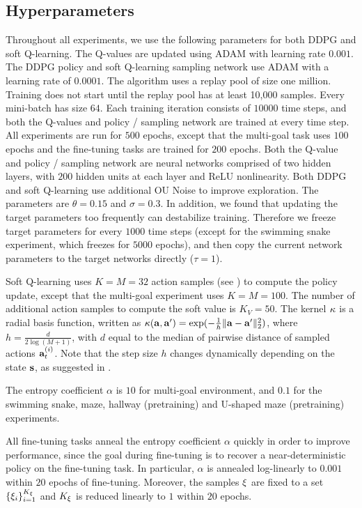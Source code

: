 \subsection{Hyperparameters}
\label{app: hyperparameters}
Throughout all experiments, we use the following parameters for both DDPG and soft Q-learning. The Q-values are updated using ADAM with learning rate $0.001$. The DDPG policy and soft Q-learning sampling network use ADAM with a learning rate of $0.0001$. The algorithm uses a replay pool of size one million. Training does not start until the replay pool has at least 10,000 samples. Every mini-batch has size $64$. Each training iteration consists of $10000$ time steps, and both the Q-values and policy / sampling network are trained at every time step. All experiments are run for $500$ epochs, except that the multi-goal task uses $100$ epochs and the fine-tuning tasks are trained for $200$ epochs. Both the Q-value and policy / sampling network are neural networks comprised of two hidden layers, with $200$ hidden units at each layer and ReLU nonlinearity. Both DDPG and soft Q-learning use additional OU Noise \cite{uhlenbeck1930theory, lillicrap2015continuous} to improve exploration. The parameters are $\theta = 0.15$ and $\sigma = 0.3$. In addition, we found that updating the target parameters too frequently can destabilize training. Therefore we freeze target parameters for every $1000$ time steps (except for the swimming snake experiment, which freezes for $5000$ epochs), and then copy the current network parameters to the target networks directly ($\tau = 1$).

Soft Q-learning uses $K=M=32$ action samples (see ) to compute the policy update, except that the multi-goal experiment uses $K=M=100$. The number of additional action samples to compute the soft value is $K_V = 50$. The kernel $\kappa$ is a radial basis function, written as $\kappa(\mathbf{a},\mathbf{a}') = \exp(-\frac{1}{h}\|\mathbf{a}-\mathbf{a}'\|_2^2)$, where $h = \frac{d}{2\log(M+1)}$, with $d$ equal to the median of pairwise distance of sampled actions ${\mathbf{a}_t^{(i)}}$. Note that the step size $h$ changes dynamically depending on the state $\mathbf{s}$, as suggested in \cite{liu2016stein}. 

The entropy coefficient $\alpha$ is $10$ for multi-goal environment, and $0.1$ for the swimming snake, maze, hallway (pretraining) and U-shaped maze (pretraining) experiments.

All fine-tuning tasks anneal the entropy coefficient $\alpha$ quickly in order to improve performance, since the goal during fine-tuning is to recover a near-deterministic policy on the fine-tuning task. In particular, $\alpha$ is annealed log-linearly to $0.001$ within $20$ epochs of fine-tuning. Moreover, the samples $\mathbf{\xi}$ are fixed to a set $\{\mathbf{\xi}_i\}_{i=1}^{K_{\mathbf{\xi}}}$ and $K_{\mathbf{\xi}}$ is reduced linearly to $1$ within $20$ epochs.

